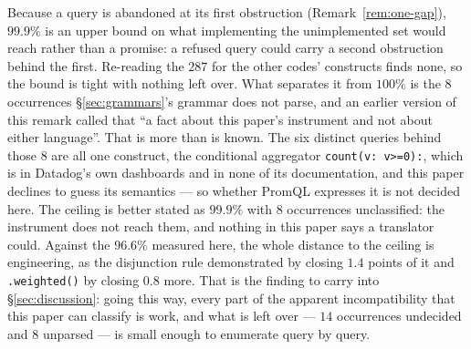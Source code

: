Because a query is abandoned at its first obstruction (Remark~\ref{rem:one-gap}),
$99.9\%$ is an upper bound on what implementing the unimplemented set would reach rather
than a promise: a refused query could carry a second obstruction behind the first.
Re-reading the $287$ for the other codes' constructs finds none, so the bound is tight
with nothing left over. What separates it from $100\%$ is the $8$ occurrences
\S\ref{sec:grammars}'s grammar does not parse, and an earlier version of this remark
called that ``a fact about this paper's instrument and not about either language''. That
is more than is known. The six distinct queries behind those $8$ are all one construct,
the conditional aggregator \texttt{count(v: v>=0):}, which is in Datadog's own dashboards
and in none of its documentation, and this paper declines to guess its semantics --- so
whether PromQL expresses it is not decided here. The ceiling is better stated as
$99.9\%$ with $8$ occurrences unclassified: the instrument does not reach them, and
nothing in this paper says a translator could. Against the $96.6\%$
measured here, the whole distance to the ceiling is engineering, as the disjunction rule
demonstrated by closing $1.4$ points of it and \texttt{.weighted()} by closing $0.8$
more. That is the finding to carry into \S\ref{sec:discussion}: going this way, every part
of the apparent incompatibility that this paper can classify is work, and what is left
over --- $14$ occurrences undecided and $8$ unparsed --- is small enough to enumerate
query by query.

